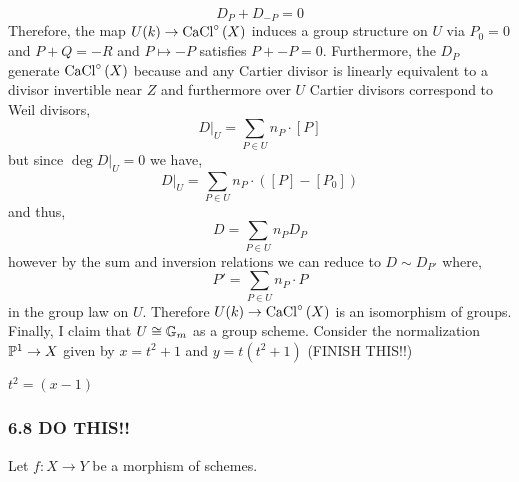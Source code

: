 \documentclass[12pt]{article}
\begin{document}
\[ D_P + D_{-P} = 0 \]
Therefore, the map $U(k) \to \CaClcirc{X}$ induces a group structure on $U$ via $P_0 = 0$ and $P + Q = -R$ and $P \mapsto -P$ satisfies $P + -P = 0$. Furthermore, the $D_P$ generate $\CaClcirc{X}$ because and any Cartier divisor is linearly equivalent to a divisor invertible near $Z$ and furthermore over $U$ Cartier divisors correspond to Weil divisors,
\[ D|_U = \sum_{P \in U} n_P \cdot [P] \]
but since $\deg{D|_U} = 0$ we have,
\[ D|_U = \sum_{P \in U} n_P \cdot ([P] - [P_0]) \]
and thus,
\[ D = \sum_{P \in U} n_P D_P \]
however by the sum and inversion relations we can reduce to $D \sim D_{P'}$ where,
\[ P' = \sum_{P \in U} n_P \cdot P \]
in the group law on $U$. Therefore $U(k) \to \CaClcirc{X}$ is an isomorphism of groups. 
\bigskip\\
Finally, I claim that $U \cong \Gm$ as a group scheme. Consider the normalization $\P^1 \to X$ given by $x = t^2  + 1$ and $y = t(t^2 + 1)$ (FINISH THIS!!)

$t^2 = (x - 1)$ 
\subsubsection{6.8 DO THIS!!}

Let $f : X \to Y$ be a morphism of schemes.
\end{document}
